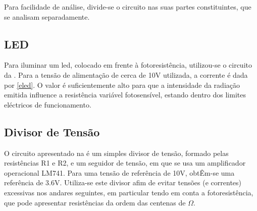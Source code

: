 \documentclass[%
  reprint,
  nofootinbib,
  amsmath,amssymb,
  aps,
  10pt,
  a4paper
]{revtex4-1}
\begin{document}
Para facilidade de análise, divide-se o circuito nas suas partes constituintes, que se analisam separadamente.


\subsection{LED}

Para iluminar um led, colocado em frente à fotoresistência, utilizou-se o circuito da . Para a tensão de alimentação de cerca de 10V utilizada, a corrente é dada por \eqref{eled}. O valor é suficientemente alto para que a intensidade da radiação emitida influence a resistência variável fotosensível, estando dentro dos limites eléctricos de funcionamento.

	
	
\subsection{Divisor de Tensão}


O circuito apresentado na  é um simples divisor de tensão, formado pelas resistências R1 e R2, e um seguidor de tensão, em que se usa um amplificador operacional LM741. Para uma tensão de referência de 10V, obtÊm-se uma referência de 3.6V. Utiliza-se este divisor afim de evitar tensões (e correntes) excessivas nos andares seguintes, em particular tendo em conta a fotoresistência, que pode apresentar resistências da ordem das centenas de $\Omega$.
\end{document}
